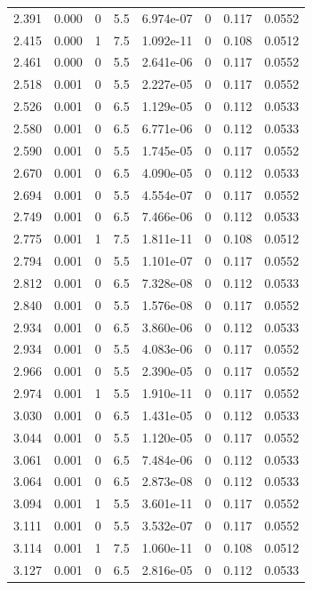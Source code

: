 \documentclass[preview]{standalone}
\begin{document}
{{{\begin{tabular}{L{1.2cm}C{1.2cm} C{0.3cm}C{0.5cm} C{1.4cm}C{1.4cm} C{1.4cm}C{1.4cm}}
  2.391  &  0.000  & 0     & 5.5 &  6.974e-07  & 0  & 0.117 &  0.0552   \\ 
  2.415  &  0.000  & 1     & 7.5 &  1.092e-11  & 0  & 0.108 &  0.0512   \\ 
  2.461  &  0.000  & 0     & 5.5 &  2.641e-06  & 0  & 0.117 &  0.0552   \\ 
  2.518  &  0.001  & 0     & 5.5 &  2.227e-05  & 0  & 0.117 &  0.0552   \\ 
  2.526  &  0.001  & 0     & 6.5 &  1.129e-05  & 0  & 0.112 &  0.0533   \\ 
  2.580  &  0.001  & 0     & 6.5 &  6.771e-06  & 0  & 0.112 &  0.0533   \\ 
  2.590  &  0.001  & 0     & 5.5 &  1.745e-05  & 0  & 0.117 &  0.0552   \\ 
  2.670  &  0.001  & 0     & 6.5 &  4.090e-05  & 0  & 0.112 &  0.0533   \\ 
  2.694  &  0.001  & 0     & 5.5 &  4.554e-07  & 0  & 0.117 &  0.0552   \\ 
  2.749  &  0.001  & 0     & 6.5 &  7.466e-06  & 0  & 0.112 &  0.0533   \\ 
  2.775  &  0.001  & 1     & 7.5 &  1.811e-11  & 0  & 0.108 &  0.0512   \\ 
  2.794  &  0.001  & 0     & 5.5 &  1.101e-07  & 0  & 0.117 &  0.0552   \\ 
  2.812  &  0.001  & 0     & 6.5 &  7.328e-08  & 0  & 0.112 &  0.0533   \\ 
  2.840  &  0.001  & 0     & 5.5 &  1.576e-08  & 0  & 0.117 &  0.0552   \\ 
  2.934  &  0.001  & 0     & 6.5 &  3.860e-06  & 0  & 0.112 &  0.0533   \\ 
  2.934  &  0.001  & 0     & 5.5 &  4.083e-06  & 0  & 0.117 &  0.0552   \\ 
  2.966  &  0.001  & 0     & 5.5 &  2.390e-05  & 0  & 0.117 &  0.0552   \\ 
  2.974  &  0.001  & 1     & 5.5 &  1.910e-11  & 0  & 0.117 &  0.0552   \\ 
  3.030  &  0.001  & 0     & 6.5 &  1.431e-05  & 0  & 0.112 &  0.0533   \\ 
  3.044  &  0.001  & 0     & 5.5 &  1.120e-05  & 0  & 0.117 &  0.0552   \\ 
  3.061  &  0.001  & 0     & 6.5 &  7.484e-06  & 0  & 0.112 &  0.0533   \\ 
  3.064  &  0.001  & 0     & 6.5 &  2.873e-08  & 0  & 0.112 &  0.0533   \\ 
  3.094  &  0.001  & 1     & 5.5 &  3.601e-11  & 0  & 0.117 &  0.0552   \\ 
  3.111  &  0.001  & 0     & 5.5 &  3.532e-07  & 0  & 0.117 &  0.0552   \\ 
  3.114  &  0.001  & 1     & 7.5 &  1.060e-11  & 0  & 0.108 &  0.0512   \\ 
  3.127  &  0.001  & 0     & 6.5 &  2.816e-05  & 0  & 0.112 &  0.0533   \\ 
\hline 
\end{tabular} 

}}}
\end{document}

